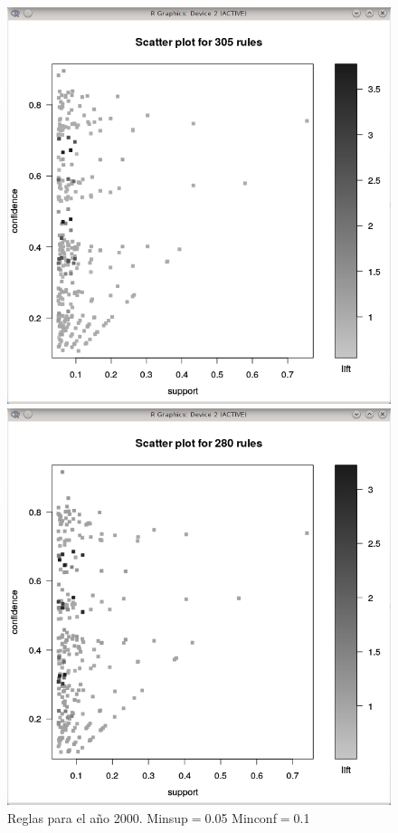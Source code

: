 \documentclass[journal]{IEEEtran}
\begin{document}
\begin{figure}[ht!]
  \includegraphics[width=\linewidth]{2000.png}
  \caption{Reglas para el año 2000. Minsup$=$0.05 Minconf$=$0.1}\label{fig:arules2000}
\endminipage\hfill
{}
  \includegraphics[width=\linewidth]{2001.png}

\end{figure}
\end{document}
